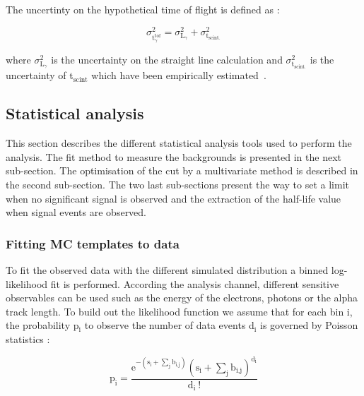 \documentclass[main.tex]{subfiles}
\begin{document}
\bigskip


\NI The uncertinty on the hypothetical time of flight is defined as :  


\begin{equation}
\sigma^\text{2}_{\text{t}_\gamma^{\text{tof}}} = \sigma^\text{2}_{\text{L}_\gamma} + \sigma^\text{2}_{\text{t}_{\text{scint.}}}
\end{equation}


\bigskip


\NI where $\sigma^\text{2}_{\text{L}_\gamma}$ is the uncertainty on the straight line calculation and $\sigma^\text{2}_{\text{t}_{\text{scint.}}}$ is the uncertainty of t$_{\text{scint}}$ which have been empirically estimated~\cite{GammaReconstructionHereward}.


\subsection{Statistical analysis}\label{sec:StatAnalysisTools}


\NI This section describes the different statistical analysis tools used to perform the analysis. The fit method to measure the backgrounds is presented in the next sub-section. The optimisation of the cut by a multivariate method is described in the second sub-section. The two last sub-sections present the way to set a limit when no significant signal is observed and the extraction of the half-life value when signal events are observed.


\subsubsection{Fitting MC templates to data}


\NI To fit the observed data with the different simulated distribution a binned log-likelihood fit is performed. According the analysis channel, different sensitive observables can be used such as the energy of the electrons, photons or the alpha track length. To build out the likelihood function we assume that for each bin i, the probability p$_\text{i}$ to observe the number of data events d$_\text{i}$ is governed by Poisson statistics :   

\begin{equation}
\text{p}_\text{i} = \frac {\text{e}^{-(\text{s}_\text{i}+\sum_\text{j} \text{b}_{\text{i,j}})} (\text{s}_\text{i}+ \sum_\text{j} \text{b}_{\text{i,j}})^{\text{d}_{\text{i}}} }  {\text{d}_\text{i}~\text{!}} 
\end{equation}
\end{document}
